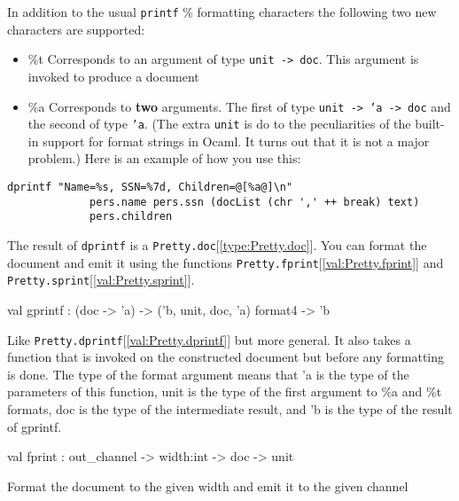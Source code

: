 \documentclass[11pt]{article}
\begin{document}
\begin{ocamldocdescription}
 In addition to the usual {\tt{printf}} \% formatting characters the following two 
 new characters are supported:\begin{itemize}
\item \%t Corresponds to an argument of type {\tt{unit -> doc}}. This argument is 
     invoked to produce a document
\item \%a Corresponds to {\bf two} arguments. The first of type {\tt{unit -> 'a -> doc}} 
     and the second of type {\tt{'a}}. (The extra {\tt{unit}} is do to the 
     peculiarities of the built-in support for format strings in Ocaml. It 
     turns out that it is not a major problem.) Here is an example of how 
     you use this:
\end{itemize}

\begin{verbatim}dprintf "Name=%s, SSN=%7d, Children=@[%a@]\n"
             pers.name pers.ssn (docList (chr ',' ++ break) text)
             pers.children\end{verbatim}


 The result of {\tt{dprintf}} is a {\tt{Pretty.doc}}[\ref{type:Pretty.doc}]. You can format the document and 
 emit it using the functions {\tt{Pretty.fprint}}[\ref{val:Pretty.fprint}] and {\tt{Pretty.sprint}}[\ref{val:Pretty.sprint}].


\end{ocamldocdescription}




\label{val:Pretty.gprintf}\begin{ocamldoccode}
val gprintf : (doc -> 'a) -> ('b, unit, doc, 'a) format4 -> 'b
\end{ocamldoccode}
\begin{ocamldocdescription}
Like {\tt{Pretty.dprintf}}[\ref{val:Pretty.dprintf}] but more general. It also takes a function that is 
 invoked on the constructed document but before any formatting is done. The 
 type of the format argument means that 'a is the type of the parameters of 
 this function, unit is the type of the first argument to \%a and \%t 
 formats, doc is the type of the intermediate result, and 'b is the type of 
 the result of gprintf.


\end{ocamldocdescription}




\label{val:Pretty.fprint}\begin{ocamldoccode}
val fprint : out_channel -> width:int -> doc -> unit
\end{ocamldoccode}
\begin{ocamldocdescription}
Format the document to the given width and emit it to the given channel


\end{ocamldocdescription}
\end{document}
